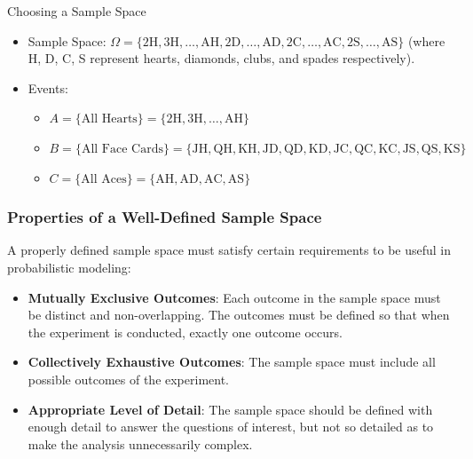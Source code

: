\begin{exampleboxbreak}{Choosing a Sample Space}
\begin{itemize}
    \item Sample Space: \( \Omega = \{\text{2H}, \text{3H}, \ldots, \text{AH}, \text{2D}, \ldots, \text{AD}, \text{2C}, \ldots, \text{AC}, \text{2S}, \ldots, \text{AS}\} \) (where H, D, C, S represent hearts, diamonds, clubs, and spades respectively).
    \item Events:
    \begin{itemize}
        \item \( A = \{\text{All Hearts}\} = \{\text{2H}, \text{3H}, \ldots, \text{AH}\} \)
        \item \( B = \{\text{All Face Cards}\} = \{\text{JH}, \text{QH}, \text{KH}, \text{JD}, \text{QD}, \text{KD}, \text{JC}, \text{QC}, \text{KC}, \text{JS}, \text{QS}, \text{KS}\} \)
        \item \( C = \{\text{All Aces}\} = \{\text{AH}, \text{AD}, \text{AC}, \text{AS}\} \)
    \end{itemize}
\end{itemize}
\end{exampleboxbreak}

\subsubsection{Properties of a Well-Defined Sample Space}

A properly defined sample space must satisfy certain requirements to be useful in probabilistic modeling:

\begin{itemize}
    \item \textbf{Mutually Exclusive Outcomes}: Each outcome in the sample space must be distinct and non-overlapping. The outcomes must be defined so that when the experiment is conducted, exactly one outcome occurs.
    
    \item \textbf{Collectively Exhaustive Outcomes}: The sample space must include all possible outcomes of the experiment.
    
    \item \textbf{Appropriate Level of Detail}: The sample space should be defined with enough detail to answer the questions of interest, but not so detailed as to make the analysis unnecessarily complex.
\end{itemize}

